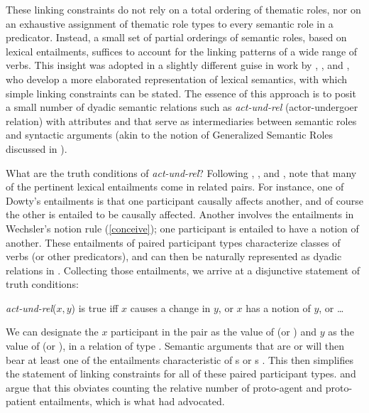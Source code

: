 \documentclass[output=paper,biblatex,babelshorthands,newtxmath,draftmode,colorlinks, citecolor=brown]{langscibook}
\begin{document}
These linking constraints do not rely on a total ordering of thematic roles, nor on an exhaustive
assignment of thematic role types to every semantic role in a predicator. Instead, a small set of
partial orderings of semantic roles, based on lexical entailments, suffices
to account for the linking patterns of a wide range of verbs.  This insight was adopted in a
slightly different guise in work by \citet{Davis1996}, \citet{Davis2001}, and
\citet{DavisandKoenig2000b}, who develop a more elaborated representation of lexical semantics, with
which simple linking constraints can be stated.  The essence of this approach is to posit a small
number of dyadic semantic relations such as \textit{act-und-rel} (actor-undergoer relation) with
attributes  and  that serve as
intermediaries between semantic roles and syntactic arguments (akin to the notion of Generalized
Semantic Roles discussed in \citealt{VanValin1999}).

\largerpage
What are the truth conditions of \textit{act-und-rel}?  Following \citet{Fillmore1977},
\citet{Dowty1991}, and \citet{Wechsler1995b}, \citeauthor{DavisandKoenig2000b} note that many of the pertinent
lexical entailments come in related pairs.  For instance, one of Dowty's entailments is that one
participant causally affects another, and of course the other is entailed to be causally affected.
Another involves the entailments in Wechsler's notion rule (\ref{conceive}); one participant is
entailed to have a notion of another.  These entailments of paired participant types characterize
classes of verbs (or other predicators), and can then be naturally represented as dyadic relations
in .  Collecting those entailments, we arrive at a disjunctive statement of truth
conditions:

\eanoraggedright
\label{def-act-und-rel}
\textit{act-und-rel}($x,y$) is true iff $x$ causes a change in $y$, or $x$ has a notion of $y$, or \ldots
\z

\noindent
We can designate the $x$ participant in the pair as the value of  (or ) and
$y$ as the value of  (or ), in a relation of type .
Semantic arguments that are  or  will then bear at least one of the
entailments characteristic of s or s
\citep[72]{DavisandKoenig2000b}. This then simplifies the statement of linking constraints for all
of these paired participant types.  \citet{Davis1996} and \citet{KoenigandDavis2001} argue that this
obviates counting the relative number of proto-agent and proto-patient entailments, which is what
\citet{Dowty1991} had advocated.
\end{document}
